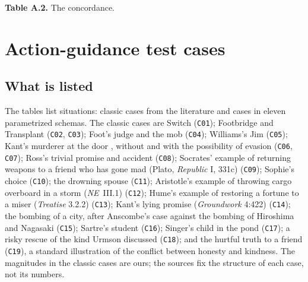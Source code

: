 \documentclass{situationist-preprint}
\begin{document}
\begin{center}\small\textbf{Table A.2.} The concordance.\end{center}


\clearpage
\section{Action-guidance test cases}\label{s:appB}

\subsection*{What is listed}

The tables list \stncases{} situations: \stnclassic{} classic cases from the literature and \stngenerated{} cases in eleven parametrized schemas. The classic cases are Switch \citep{Foot1967,Thomson1985} (\texttt{C01}); Footbridge and Transplant \citep{Thomson1976,Thomson1985} (\texttt{C02}, \texttt{C03}); Foot's judge and the mob \citep{Foot1967} (\texttt{C04}); Williams's Jim \citep{Williams1973} (\texttt{C05}); Kant's murderer at the door \citep{Kant1797}, without and with the possibility of evasion (\texttt{C06}, \texttt{C07}); Ross's trivial promise and accident \citep{Ross1930} (\texttt{C08}); Socrates' example of returning weapons to a friend who has gone mad (Plato, \emph{Republic} I, 331c) \citep{PlatoRep} (\texttt{C09}); Sophie's choice \citep{Styron1979} (\texttt{C10}); the drowning spouse \citep{Williams1981} (\texttt{C11}); Aristotle's example of throwing cargo overboard in a storm (\emph{NE}~III.1) (\texttt{C12}); Hume's example of restoring a fortune to a miser (\emph{Treatise} 3.2.2) (\texttt{C13}); Kant's lying promise (\emph{Groundwork} 4:422) \citep{Kant1785} (\texttt{C14}); the bombing of a city, after Anscombe's case against the bombing of Hiroshima and Nagasaki \citep{Anscombe1981} (\texttt{C15}); Sartre's student \citep{Sartre1946} (\texttt{C16}); Singer's child in the pond \citep{Singer1972} (\texttt{C17}); a risky rescue of the kind Urmson discussed \citep{Urmson1958} (\texttt{C18}); and the hurtful truth to a friend (\texttt{C19}), a standard illustration of the conflict between honesty and kindness. The magnitudes in the classic cases are ours; the sources fix the structure of each case, not its numbers.
\end{document}
